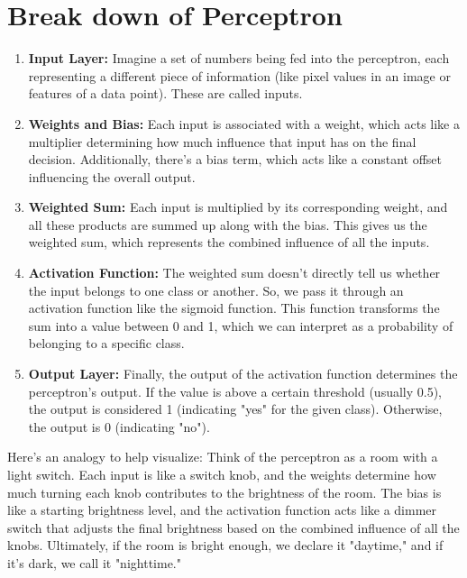 \section{Break down of Perceptron}
    \begin{enumerate}
        \item \textbf{Input Layer:}
        Imagine a set of numbers being fed into the perceptron, each representing a different piece of information (like pixel values in an image or features of a data point). These are called inputs.

        \item \textbf{Weights and Bias:}
        Each input is associated with a weight, which acts like a multiplier determining how much influence that input has on the final decision. Additionally, there's a bias term, which acts like a constant offset influencing the overall output.

        \item \textbf{Weighted Sum:}
        Each input is multiplied by its corresponding weight, and all these products are summed up along with the bias. This gives us the weighted sum, which represents the combined influence of all the inputs.

        \item \textbf{Activation Function:}
        The weighted sum doesn't directly tell us whether the input belongs to one class or another. So, we pass it through an activation function like the sigmoid function. This function transforms the sum into a value between 0 and 1, which we can interpret as a probability of belonging to a specific class.
        
        \item \textbf{Output Layer:}
        Finally, the output of the activation function determines the perceptron's output. If the value is above a certain threshold (usually 0.5), the output is considered 1 (indicating "yes" for the given class). Otherwise, the output is 0 (indicating "no").
    \end{enumerate}
Here's an analogy to help visualize:
Think of the perceptron as a room with a light switch. Each input is like a switch knob, and the weights determine how much turning each knob contributes to the brightness of the room. The bias is like a starting brightness level, and the activation function acts like a dimmer switch that adjusts the final brightness based on the combined influence of all the knobs. Ultimately, if the room is bright enough, we declare it "daytime," and if it's dark, we call it "nighttime."

